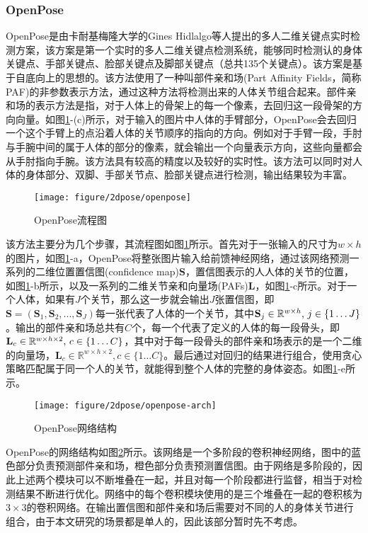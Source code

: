 \subsubsection{OpenPose}
OpenPose\cite{openpose}是由卡耐基梅隆大学的Gines Hidlalgo等人提出的多人二维关键点实时检测方案，该方案是第一个实时的多人二维关键点检测系统，能够同时检测认的身体关键点、手部关键点、脸部关键点及脚部关键点（总共135个关键点）。该方案是基于自底向上的思想的。该方法使用了一种叫部件亲和场(Part Affinity Fields，简称PAF)的非参数表示方法，通过这种方法将检测出来的人体关节组合起来。部件亲和场的表示方法是指，对于人体上的骨架上的每一个像素，去回归这一段骨架的方向向量。如图\ref{fig:2d-op}-(c)所示，对于输入的图片中人体的手臂部分，OpenPose会去回归一个这个手臂上的点沿着人体的关节顺序的指向的方向。例如对于手臂一段，手肘与手腕中间的属于人体的部分的像素，就会输出一个向量表示方向，这些向量都会从手肘指向手腕。该方法具有较高的精度以及较好的实时性。该方法可以同时对人体的身体部分、双脚、手部关节点、脸部关键点进行检测，输出结果较为丰富。
\begin{figure}[H]
    \centering
    \texttt{[image: figure/2dpose/openpose]}
    \caption{\label{fig:2d-op} OpenPose流程图}
\end{figure}
该方法主要分为几个步骤，其流程图如图\ref{fig:2d-op}所示。首先对于一张输入的尺寸为\(w\times h\)的图片，如图\ref{fig:2d-op}-a，OpenPose将整张图片输入给前馈神经网络，通过该网络预测一系列的二维位置置信图(confidence map)\(\mathbf{S}\)，置信图表示的人人体的关节的位置，如图\ref{fig:2d-op}-b所示，以及一系列的二维关节亲和向量场(PAFs)\(\mathbf{L}\)，如图\ref{fig:2d-op}-c所示。对于一个人体，如果有\(J\)个关节，那么这一步就会输出\(J\)张置信图，即\(\mathbf{S}=(\mathbf{S}_1, \mathbf{S}_2, ..., \mathbf{S}_J)\)每一张代表了人体的一个关节，其中\(\mathbf{S}_{j}\in \mathbb{R}^{w\times h}$, $j \in \{1\ldots J\}\)。输出的部件亲和场总共有\(C\)个，每一个代表了定义的人体的每一段骨头，即\(\mathbf{L}_{c}\in \mathbb{R}^{w\times h \times 2}$, $c \in \{1\ldots C\}\)，其中对于每一段骨头的部件亲和场表示的是一个二维的向量场，\(\mathbf{L}_{c}\in \mathbb{R}^{w\times h \times 2}, c \in \{1\ldots C\}\)。最后通过对回归的结果进行组合，使用贪心策略匹配属于同一个人的关节，就能得到整个人体的完整的身体姿态。如图\ref{fig:2d-op}-e所示。

\begin{figure}[H]
    \centering
    \texttt{[image: figure/2dpose/openpose-arch]}
    \caption{\label{fig:2d-op-net} OpenPose网络结构}
\end{figure}
OpenPose的网络结构如图\ref{fig:2d-op-net}所示。该网络是一个多阶段的卷积神经网络，图中的蓝色部分负责预测部件亲和场，橙色部分负责预测置信图。由于网络是多阶段的，因此上述两个模块可以不断堆叠在一起，并且对每一个阶段都进行监督，相当于对检测结果不断进行优化。网络中的每个卷积模块使用的是三个堆叠在一起的卷积核为\(3\times 3\)的卷积网络。在输出置信图和部件亲和场后需要对不同的人的身体关节进行组合，由于本文研究的场景都是单人的，因此该部分暂时先不考虑。

